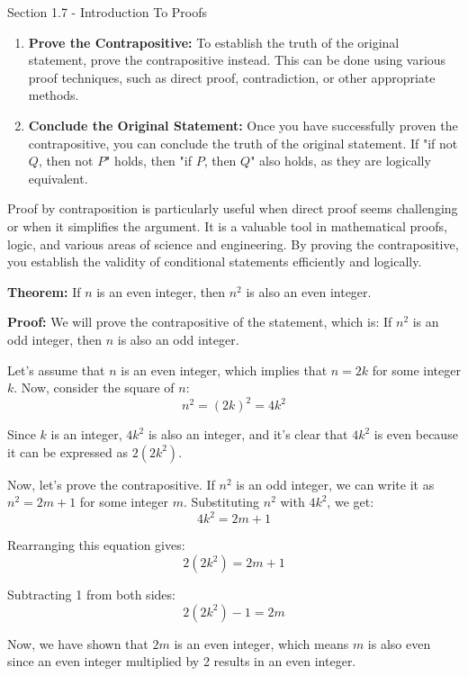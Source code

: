 \begin{notes}{Section 1.7 - Introduction To Proofs}
\begin{enumerate}
        \item \textbf{Prove the Contrapositive:} To establish the truth of the original statement, prove the contrapositive instead. This can be done using various proof techniques, such as direct proof, 
        contradiction, or other appropriate methods.
        
        \item \textbf{Conclude the Original Statement:} Once you have successfully proven the contrapositive, you can conclude the truth of the original statement. If "if not $Q$, then not $P$" holds, then "if $P$, 
        then $Q$" also holds, as they are logically equivalent.
    \end{enumerate}
    
    Proof by contraposition is particularly useful when direct proof seems challenging or when it simplifies the argument. It is a valuable tool in mathematical proofs, logic, and various areas of science and 
    engineering. By proving the contrapositive, you establish the validity of conditional statements efficiently and logically.
    
    \begin{Highlight}
        \textbf{Theorem:} If $n$ is an even integer, then $n^2$ is also an even integer.
        
        
        \textbf{Proof:} We will prove the contrapositive of the statement, which is: If $n^2$ is an odd integer, then $n$ is also an odd integer.
        
        Let's assume that $n$ is an even integer, which implies that $n = 2k$ for some integer $k$. Now, consider the square of $n$:
        \[n^2 = (2k)^2 = 4k^2\]
        
        Since $k$ is an integer, $4k^2$ is also an integer, and it's clear that $4k^2$ is even because it can be expressed as $2(2k^2)$.
        
        Now, let's prove the contrapositive. If $n^2$ is an odd integer, we can write it as $n^2 = 2m + 1$ for some integer $m$. Substituting $n^2$ with $4k^2$, we get:
        \[4k^2 = 2m + 1\]
        
        Rearranging this equation gives:
        \[2(2k^2) = 2m + 1\]
        
        Subtracting 1 from both sides:
        \[2(2k^2) - 1 = 2m\]
        
        Now, we have shown that $2m$ is an even integer, which means $m$ is also even since an even integer multiplied by 2 results in an even integer.
        

\end{Highlight}
\end{notes}
